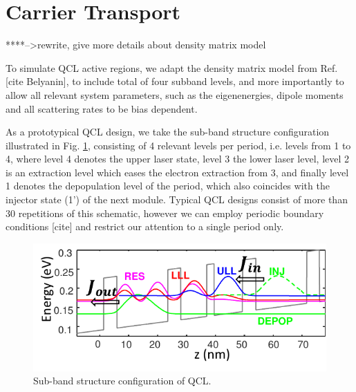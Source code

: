 \documentclass[11pt,final]{scrbook}
\begin{document}
\section{Carrier Transport}
****-->rewrite, give more details about density matrix model

To simulate QCL active regions, we adapt the density matrix model from Ref. [cite Belyanin], to include total of four subband levels, and more importantly to allow all relevant system parameters, such as the eigenenergies, dipole moments and all scattering rates to be bias dependent. 

As a prototypical QCL design, we take the sub-band structure configuration illustrated in Fig. \ref{fig:4Levels}, consisting of 4 relevant levels per period, i.e. levels from 1 to 4, where level 4 denotes the upper laser state, level 3 the lower laser level, level 2 is an extraction level which eases the electron extraction from 3, and finally level 1 denotes the depopulation level of the period, which also coincides with the injector state (1') of the next module. Typical QCL designs consist of more than 30 repetitions of this schematic, however we can employ periodic boundary conditions [cite] and restrict our attention to a single period only. 

\begin{figure}[htbp]
\begin{center}
\includegraphics[scale=1.2]{WFs.pdf}
\caption{Sub-band structure configuration of QCL.}
\label{fig:4Levels}
\end{center}
\end{figure}
\end{document}
